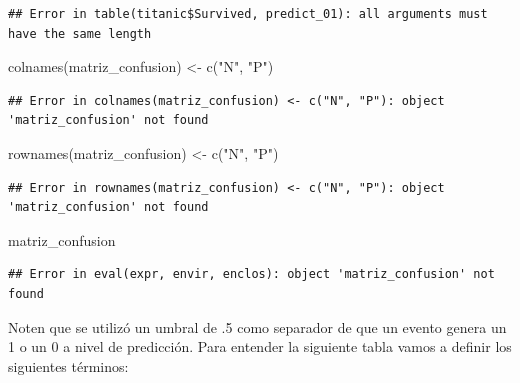 \documentclass[
  12pt,
]{book}
\newenvironment{Shaded}{\begin{snugshade}}{\end{snugshade}}
\newcommand{\FunctionTok}[1]{\textcolor[rgb]{0.00,0.00,0.00}{#1}}
\newcommand{\NormalTok}[1]{#1}
\newcommand{\OtherTok}[1]{\textcolor[rgb]{0.56,0.35,0.01}{#1}}
\newcommand{\StringTok}[1]{\textcolor[rgb]{0.31,0.60,0.02}{#1}}
\begin{document}
\begin{verbatim}
## Error in table(titanic$Survived, predict_01): all arguments must have the same length
\end{verbatim}

\begin{Shaded}
\begin{Highlighting}[]
\FunctionTok{colnames}\NormalTok{(matriz\_confusion) }\OtherTok{\textless{}{-}} \FunctionTok{c}\NormalTok{(}\StringTok{"N"}\NormalTok{, }\StringTok{"P"}\NormalTok{)}
\end{Highlighting}
\end{Shaded}

\begin{verbatim}
## Error in colnames(matriz_confusion) <- c("N", "P"): object 'matriz_confusion' not found
\end{verbatim}

\begin{Shaded}
\begin{Highlighting}[]
\FunctionTok{rownames}\NormalTok{(matriz\_confusion) }\OtherTok{\textless{}{-}} \FunctionTok{c}\NormalTok{(}\StringTok{"N"}\NormalTok{, }\StringTok{"P"}\NormalTok{)}
\end{Highlighting}
\end{Shaded}

\begin{verbatim}
## Error in rownames(matriz_confusion) <- c("N", "P"): object 'matriz_confusion' not found
\end{verbatim}

\begin{Shaded}
\begin{Highlighting}[]
\NormalTok{matriz\_confusion}
\end{Highlighting}
\end{Shaded}

\begin{verbatim}
## Error in eval(expr, envir, enclos): object 'matriz_confusion' not found
\end{verbatim}

Noten que se utilizó un umbral de .5 como separador de que un evento
genera un 1 o un 0 a nivel de predicción. Para entender la siguiente
tabla vamos a definir los siguientes términos:
\end{document}
